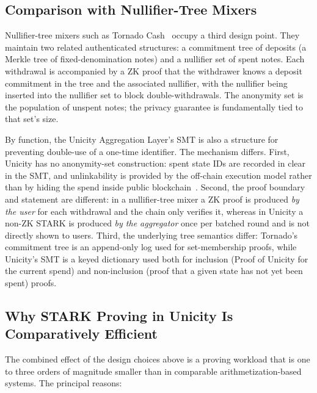 \documentclass[twocolumn]{article}
\begin{document}
\subsection{Comparison with Nullifier-Tree Mixers}

Nullifier-tree mixers such as Tornado Cash~\cite{tornado} occupy a third design point. They maintain two related authenticated structures: a commitment tree of deposits (a Merkle tree of fixed-denomination notes) and a nullifier set of spent notes. Each withdrawal is accompanied by a ZK proof that the withdrawer knows a deposit commitment in the tree and the associated nullifier, with the nullifier being inserted into the nullifier set to block double-withdrawals. The anonymity set is the population of unspent notes; the privacy guarantee is fundamentally tied to that set's size.

By function, the Unicity Aggregation Layer's SMT is also a structure for preventing double-use of a one-time identifier. The mechanism differs. First, Unicity has no anonymity-set construction: spent state IDs are recorded in clear in the SMT, and unlinkability is provided by the off-chain execution model rather than by hiding the spend inside public blockchain~\cite{exemodel}. Second, the proof boundary and statement are different: in a nullifier-tree mixer a ZK proof is produced \emph{by the user} for each withdrawal and the chain only verifies it, whereas in Unicity a non-ZK STARK is produced \emph{by the aggregator} once per batched round and is not directly shown to users. Third, the underlying tree semantics differ: Tornado's commitment tree is an append-only log used for set-membership proofs, while Unicity's SMT is a keyed dictionary used both for inclusion (Proof of Unicity for the current spend) and non-inclusion (proof that a given state has not yet been spent) proofs.

\subsection{Why STARK Proving in Unicity Is Comparatively Efficient}

The combined effect of the design choices above is a proving workload that is one to three orders of magnitude smaller than in comparable arithmetization-based systems. The principal reasons:
\end{document}
